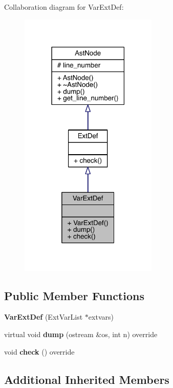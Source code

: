 Collaboration diagram for Var\+Ext\+Def\+:\nopagebreak
\begin{figure}[H]
\begin{center}
\leavevmode
\includegraphics[width=186pt]{class_var_ext_def__coll__graph}
\end{center}
\end{figure}
\subsection*{Public Member Functions}
\begin{DoxyCompactItemize}
\item 
\mbox{\label{class_var_ext_def_a8ba52350a3f35cb8eeafbdb678df5ea9}} 
{\bfseries Var\+Ext\+Def} (Ext\+Var\+List $\ast$extvars)
\item 
\mbox{\label{class_var_ext_def_af91ffac816eca11ee3dde6c454cad868}} 
virtual void {\bfseries dump} (ostream \&os, int n) override
\item 
\mbox{\label{class_var_ext_def_aaa89f410f59265cf9f5d2317ae261aa8}} 
void {\bfseries check} () override
\end{DoxyCompactItemize}
\subsection*{Additional Inherited Members}


